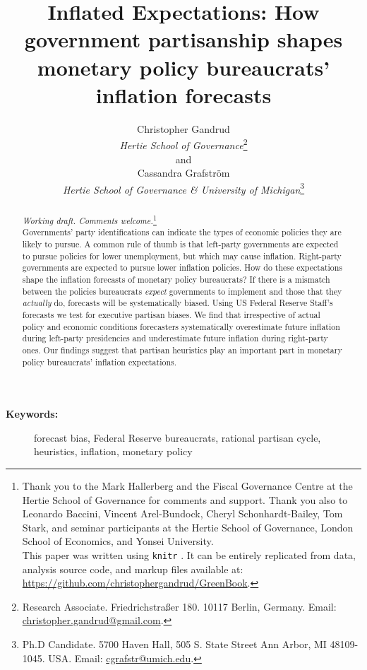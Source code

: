 \documentclass[a4paper]{article}\usepackage{graphicx, color}
\title{Inflated Expectations: How government partisanship shapes monetary policy bureaucrats' inflation forecasts}
\author{Christopher Gandrud \\
                {\emph{Hertie School of Governance}}\footnote{Research Associate. Friedrichstra{\ss}er 180. 10117 Berlin, Germany. Email: \href{mailto:christopher.gandrud@gmail.com}{christopher.gandrud@gmail.com}.} \\
                and \\
            Cassandra Grafstr\"{o}m \\
                {\emph{Hertie School of Governance \& University of Michigan}}\footnote{Ph.D Candidate. 5700 Haven Hall, 505 S. State Street
                Ann Arbor, MI 48109-1045. USA. Email: \href{mailto:cgrafstr@umich.edu}{cgrafstr@umich.edu}.}}
\begin{document}
\maketitle

\begin{abstract}
\noindent\emph{Working draft. Comments welcome.}\footnote{Thank you to the Mark Hallerberg and the Fiscal Governance Centre at the Hertie School of Governance for comments and support. Thank you also to Leonardo Baccini, Vincent Arel-Bundock, Cheryl Schonhardt-Bailey, Tom Stark, and seminar participants at the Hertie School of Governance, London School of Economics, and Yonsei University. \\
This paper was written using {\tt{knitr}} \citep{knitr2013}. It can be entirely replicated from data, analysis source code, and markup files available at: {\url{https://github.com/christophergandrud/GreenBook}}.} \\[0.2cm]


Governments' party identifications can indicate the types of economic policies they are likely to pursue. A common rule of thumb is that left-party governments are expected to pursue policies for lower unemployment, but which may cause inflation. Right-party governments are expected to pursue lower inflation policies. How do these expectations shape the inflation forecasts of monetary policy bureaucrats? If there is a mismatch between the policies bureaucrats \emph{expect} governments to implement and those that they \emph{actually} do, forecasts will be systematically biased. Using US Federal Reserve Staff’s forecasts we test for executive partisan biases. We find that irrespective of actual policy and economic conditions forecasters systematically overestimate future inflation during left-party presidencies and underestimate future inflation during right-party ones. Our findings suggest that partisan heuristics play an important part in monetary policy bureaucrats' inflation expectations.

\end{abstract}

\begin{description}
  \item [{\textbf{Keywords:}}] forecast bias, Federal Reserve bureaucrats, rational partisan cycle, heuristics, inflation, monetary policy
\end{description}

\vspace{0.3cm}
\end{document}

